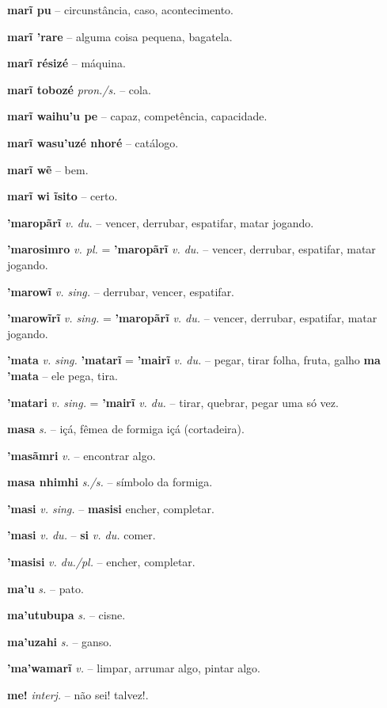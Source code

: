 \textbf{marĩ pu} -- circunstância, caso, acontecimento.

\textbf{marĩ 'rare} -- alguma coisa pequena, bagatela.

\textbf{marĩ résizé} -- máquina.

\textbf{marĩ tobozé} \textit{pron./s.} -- cola.

\textbf{marĩ waihu'u pe} -- capaz, competência, capacidade.

\textbf{marĩ wasu'uzé nhoré} -- catálogo.

\textbf{marĩ wẽ} -- bem.

\textbf{marĩ wi ĩsito} -- certo.

\textbf{'maropãrĩ} \textit{v. du.} -- vencer, derrubar, espatifar, matar jogando.

\textbf{'marosimro} \textit{v. pl.} = \textbf{'maropãrĩ} \textit{v. du.} -- vencer, derrubar, espatifar, matar jogando.

\textbf{'marowĩ} \textit{v. sing.} -- derrubar, vencer, espatifar.

\textbf{'marowĩrĩ} \textit{v. sing.} = \textbf{'maropãrĩ} \textit{v. du.} -- vencer, derrubar, espatifar, matar jogando.

\textbf{'mata} \textit{v. sing.} \textbf{'matarĩ} = \textbf{'mairĩ} \textit{v. du.} -- pegar, tirar folha, fruta, galho  \textbf{ma 'mata} -- ele pega, tira.

\textbf{'matari} \textit{v. sing.} = \textbf{'mairĩ} \textit{v. du.} -- tirar, quebrar, pegar uma só vez.

\textbf{masa} \textit{s.} -- içá, fêmea de formiga içá (cortadeira).

\textbf{'masãmri} \textit{v.} -- encontrar algo.

\textbf{masa nhimhi} \textit{s./s.} -- símbolo da formiga.

\textbf{'masi} \textit{v. sing.} -- \textbf{masisi} encher, completar.

\textbf{'masi} \textit{v. du.} -- \textbf{si} \textit{v. du.} comer.

\textbf{'masisi} \textit{v. du./pl.} -- encher, completar.

\textbf{ma'u} \textit{s.} -- pato.

\textbf{ma'utubupa} \textit{s.} -- cisne.

\textbf{ma'uzahi} \textit{s.} -- ganso.

\textbf{'ma'wamarĩ} \textit{v.} -- limpar, arrumar algo, pintar algo.

\textbf{me!} \textit{interj.} -- não sei! talvez!.

